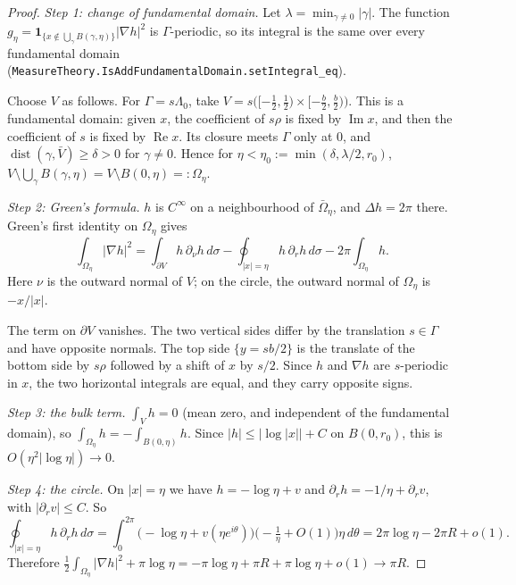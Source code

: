 \documentclass[11pt]{article}
\theoremstyle{definition}
\theoremstyle{remark}
\newcommand{\LamO}{\Lambda_0}
\newcommand{\lean}[1]{\texttt{#1}}
\DeclareMathOperator{\Real}{Re}
\DeclareMathOperator{\Imag}{Im}
\begin{document}
\begin{proof}
\emph{Step 1: change of fundamental domain.} Let $\lambda=\min_{\gamma\ne0}|\gamma|$. The function
$g_\eta=\mathbf 1_{\{x\notin\bigcup_\gamma B(\gamma,\eta)\}}|\nabla h|^2$ is $\Gamma$-periodic, so its integral is
the same over every fundamental domain
(\lean{MeasureTheory.IsAddFundamentalDomain.setIntegral\_eq}).

Choose $V$ as follows. For $\Gamma=s\LamO$, take
$V=s\bigl([-\tfrac12,\tfrac12)\times[-\tfrac b2,\tfrac b2)\bigr)$. This is a fundamental domain: given $x$, the
coefficient of $s\rho$ is fixed by $\Imag x$, and then the coefficient of $s$ is fixed by $\Real x$. Its closure
meets $\Gamma$ only at $0$, and $\operatorname{dist}(\gamma,\bar V)\ge \delta>0$ for $\gamma\ne0$. Hence for
$\eta<\eta_0:=\min(\delta,\lambda/2,r_0)$, $V\setminus\bigcup_\gamma B(\gamma,\eta)=V\setminus B(0,\eta)=:\Omega_\eta$.

\emph{Step 2: Green's formula.} $h$ is $C^\infty$ on a neighbourhood of $\bar\Omega_\eta$, and $\Delta h=2\pi$ there.
Green's first identity on $\Omega_\eta$ gives
\[
 \int_{\Omega_\eta}|\nabla h|^2=\int_{\partial V}h\,\partial_\nu h\,d\sigma-\oint_{|x|=\eta}h\,\partial_rh\,d\sigma
 -2\pi\int_{\Omega_\eta}h .
\]
Here $\nu$ is the outward normal of $V$; on the circle, the outward normal of $\Omega_\eta$ is $-x/|x|$.

The term on $\partial V$ vanishes. The two vertical sides differ by the translation $s\in\Gamma$ and have opposite
normals. The top side $\{y=sb/2\}$ is the translate of the bottom side by $s\rho$ followed by a shift of
$x$ by $s/2$. Since $h$ and $\nabla h$ are $s$-periodic in $x$, the two horizontal integrals are equal, and they
carry opposite signs.

\emph{Step 3: the bulk term.} $\int_V h=0$ (mean zero, and independent of the fundamental domain), so
$\int_{\Omega_\eta}h=-\int_{B(0,\eta)}h$. Since $|h|\le|\log|x||+C$ on $B(0,r_0)$, this is $O(\eta^2|\log\eta|)\to0$.

\emph{Step 4: the circle.} On $|x|=\eta$ we have $h=-\log\eta+v$ and $\partial_rh=-1/\eta+\partial_rv$, with
$|\partial_rv|\le C$. So
\[
 \oint_{|x|=\eta}h\,\partial_rh\,d\sigma=\int_0^{2\pi}\bigl(-\log\eta+v(\eta e^{i\theta})\bigr)
 \bigl(-\tfrac1\eta+O(1)\bigr)\eta\,d\theta=2\pi\log\eta-2\pi R+o(1).
\]
Therefore $\tfrac12\int_{\Omega_\eta}|\nabla h|^2+\pi\log\eta=-\pi\log\eta+\pi R+\pi\log\eta+o(1)\to\pi R$.
\end{proof}
\end{document}
